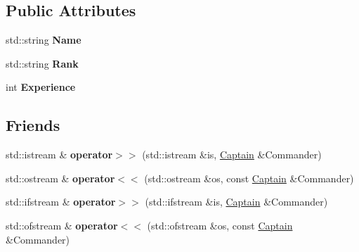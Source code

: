 \subsection*{Public Attributes}
\begin{DoxyCompactItemize}
\item 
\mbox{\label{struct_aircraft_carrier_group_1_1_captain_a978fb4171ae9db5a98cfe21dd8e03425}} 
std\+::string {\bfseries Name}
\item 
\mbox{\label{struct_aircraft_carrier_group_1_1_captain_af09effcfd568475fde2fcf2e3c55cb1f}} 
std\+::string {\bfseries Rank}
\item 
\mbox{\label{struct_aircraft_carrier_group_1_1_captain_a10365f6ea96d64ebd34649f1c9656902}} 
int {\bfseries Experience}
\end{DoxyCompactItemize}
\subsection*{Friends}
\begin{DoxyCompactItemize}
\item 
\mbox{\label{struct_aircraft_carrier_group_1_1_captain_a276745bd693dc7b587811f496c7f100b}} 
std\+::istream \& {\bfseries operator$>$$>$} (std\+::istream \&is, \mbox{\hyperlink{struct_aircraft_carrier_group_1_1_captain}{Captain}} \&Commander)
\item 
\mbox{\label{struct_aircraft_carrier_group_1_1_captain_a3d5328753431802e2ddd6be9468138a6}} 
std\+::ostream \& {\bfseries operator$<$$<$} (std\+::ostream \&os, const \mbox{\hyperlink{struct_aircraft_carrier_group_1_1_captain}{Captain}} \&Commander)
\item 
\mbox{\label{struct_aircraft_carrier_group_1_1_captain_af4bdd39ebe7d66247cbf7026a3c215ba}} 
std\+::ifstream \& {\bfseries operator$>$$>$} (std\+::ifstream \&is, \mbox{\hyperlink{struct_aircraft_carrier_group_1_1_captain}{Captain}} \&Commander)
\item 
\mbox{\label{struct_aircraft_carrier_group_1_1_captain_a8e6f82a6a1f396fbd9c1220719c8d568}} 
std\+::ofstream \& {\bfseries operator$<$$<$} (std\+::ofstream \&os, const \mbox{\hyperlink{struct_aircraft_carrier_group_1_1_captain}{Captain}} \&Commander)
\end{DoxyCompactItemize}


